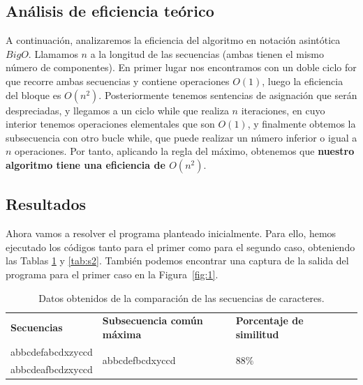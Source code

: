 


\subsection{Análisis de eficiencia teórico}

A continuación, analizaremos la eficiencia del algoritmo en notación asintótica $BigO$.
Llamamos $n$ a la longitud de las secuencias (ambas tienen el mismo número de componentes). En primer lugar nos encontramos con un doble ciclo for que recorre ambas
secuencias y contiene operaciones $O(1)$, luego la eficiencia del bloque es $O(n^{2})$.
Posteriormente tenemos sentencias de asignación que serán despreciadas, y llegamos a un
ciclo while que realiza $n$ iteraciones, en cuyo interior tenemos operaciones elementales que son $O(1)$, y finalmente obtemos la subsecuencia con otro bucle while, que puede realizar un número inferior o igual a $n$ operaciones. Por tanto, aplicando la regla del máximo, obtenemos que \textbf{nuestro algoritmo tiene una eficiencia de $O(n^{2})$}.
 

\subsection{Resultados}

Ahora vamos a resolver el programa planteado inicialmente. Para ello,
hemos ejecutado los códigos tanto para el primer como para el segundo caso,
obteniendo las Tablas \ref{tab:s1} y \ref{tab:s2}. También podemos encontrar
una captura de la salida del programa para el primer caso en la Figura~\ref{fig:1}. 

\begin{table}[h]
    \footnotesize
    \centering
	\begin{tabular}{|l|l|l|ll}
		\cline{1-3}
		\textbf{Secuencias}                           & \textbf{Subsecuencia común máxima}                       & \textbf{Porcentaje de similitud}     &  &  \\ \cline{1-3}
		abbcdefabcdxzyccd                    & \multirow{2}{*}{abbcdefbcdxyccd}                & \multirow{2}{*}{$88 \%$}    &  &  \\ \cline{1-1}
		abbcdeafbcdzxyccd                    &                                                 &                             &  &  \\ \cline{1-3}
	\end{tabular}
  \caption{Datos obtenidos de la comparación de las secuencias de caracteres.}
  \label{tab:s1}
\end{table}

